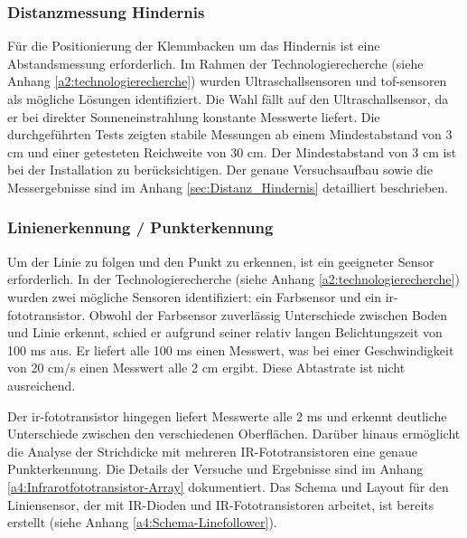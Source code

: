 \documentclass[../main.tex]{subfiles}
\begin{document}
\subsubsection{Distanzmessung Hindernis}
Für die Positionierung der Klemmbacken um das Hindernis ist eine Abstandsmessung erforderlich. Im Rahmen der Technologierecherche (siehe Anhang \ref{a2:technologierecherche}) wurden Ultraschallsensoren und \acrshort{tof-sensor}en als mögliche Lösungen identifiziert. Die Wahl fällt auf den Ultraschallsensor, da er bei direkter Sonneneinstrahlung konstante Messwerte liefert. Die durchgeführten Tests zeigten stabile Messungen ab einem Mindestabstand von 3 cm und einer getesteten Reichweite von 30 cm. Der Mindestabstand von 3 cm ist bei der Installation zu berücksichtigen. Der genaue Versuchsaufbau sowie die Messergebnisse sind im Anhang \ref{sec:Distanz_Hindernis} detailliert beschrieben.

\subsubsection{Linienerkennung / Punkterkennung}
Um der Linie zu folgen und den Punkt zu erkennen, ist ein geeigneter Sensor erforderlich. In der Technologierecherche (siehe Anhang \ref{a2:technologierecherche}) wurden zwei mögliche Sensoren identifiziert: ein Farbsensor und ein \gls{ir-fototransistor}. Obwohl der Farbsensor zuverlässig Unterschiede zwischen Boden und Linie erkennt, schied er aufgrund seiner relativ langen Belichtungszeit von 100 ms aus. Er liefert alle 100 ms einen Messwert, was bei einer Geschwindigkeit von 20 cm/s einen Messwert alle 2 cm ergibt. Diese Abtastrate ist nicht ausreichend.

Der \gls{ir-fototransistor} hingegen liefert Messwerte alle 2 ms und erkennt deutliche Unterschiede zwischen den verschiedenen Oberflächen. Darüber hinaus ermöglicht die Analyse der Strichdicke mit mehreren IR-Fototransistoren eine genaue Punkterkennung. Die Details der Versuche und Ergebnisse sind im Anhang \ref{a4:Infrarotfototransistor-Array} dokumentiert.
Das Schema und Layout für den Liniensensor, der mit IR-Dioden und IR-Fototransistoren arbeitet, ist bereits erstellt (siehe Anhang \ref{a4:Schema-Linefollower}).
\end{document}
